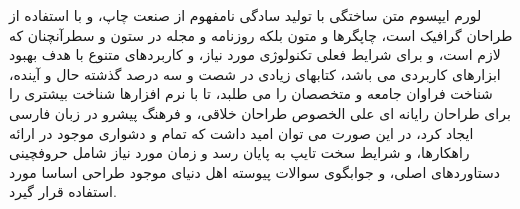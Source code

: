 \label{related-works}

لورم ایپسوم متن ساختگی با تولید سادگی نامفهوم از صنعت چاپ، و با استفاده از طراحان گرافیک است، چاپگرها و متون بلکه روزنامه و مجله در ستون و سطرآنچنان که لازم است، و برای شرایط فعلی تکنولوژی مورد نیاز، و کاربردهای متنوع با هدف بهبود ابزارهای کاربردی می باشد، کتابهای زیادی در شصت و سه درصد گذشته حال و آینده، شناخت فراوان جامعه و متخصصان را می طلبد، تا با نرم افزارها شناخت بیشتری را برای طراحان رایانه ای علی الخصوص طراحان خلاقی، و فرهنگ پیشرو در زبان فارسی ایجاد کرد، در این صورت می توان امید داشت که تمام و دشواری موجود در ارائه راهکارها، و شرایط سخت تایپ به پایان رسد و زمان مورد نیاز شامل حروفچینی دستاوردهای اصلی، و جوابگوی سوالات پیوسته اهل دنیای موجود طراحی اساسا مورد استفاده قرار گیرد.